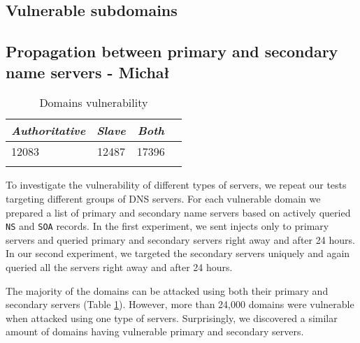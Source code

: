 \subsection{Vulnerable subdomains}
\subsection{Propagation between primary and secondary name servers - Michał}

\begin{table}
  \caption{Domains vulnerability \label{tab:propagation_vulnerable}}
 \centering
\begin{tabular}{l*{3}{c}}
\Xhline{2\arrayrulewidth}
\textbf{\textit{Authoritative}}  & \textbf{\textit{Slave}} & \textbf{\textit{Both}} \\
\hline
12083 & 12487 & 17396 \\
\Xhline{2\arrayrulewidth}
 \end{tabular}
\end{table}



To investigate the vulnerability of different types of servers, we repeat our tests targeting different groups of DNS servers. For each vulnerable domain we prepared a list of primary and secondary name servers based on actively queried \texttt{NS} and \texttt{SOA} records. In the first experiment, we sent injects only to primary servers and queried primary and secondary servers right away and after 24 hours. In our second experiment, we targeted the secondary servers uniquely and again queried all the servers right away and after 24 hours. 

The majority of the domains can be attacked using both their primary and secondary servers (Table \ref{tab:propagation_vulnerable}). However, more than 24,000 domains were vulnerable when attacked using one type of servers. Surprisingly, we discovered a similar amount of domains having vulnerable primary and secondary servers. 

